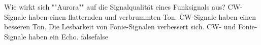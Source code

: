     {Wie wirkt sich ""Aurora"" auf die Signalqualität eines Funksignals aus?}
    {CW-Signale haben einen flatternden und verbrummten Ton.}
    {CW-Signale haben einen besseren Ton.}
    {Die Lesbarkeit von Fonie-Signalen verbessert sich.}
    {CW- und Fonie-Signale haben ein Echo.}
    {false}{false}